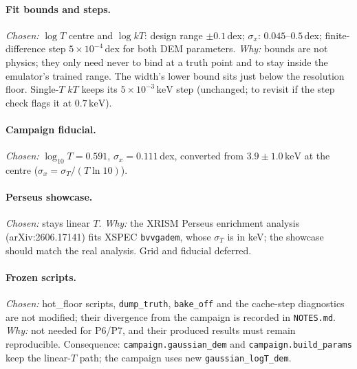 \documentclass[11pt]{article}
\newcommand{\kev}{\,\mathrm{keV}}
\begin{document}
\paragraph{Fit bounds and steps.} \emph{Chosen:} $\log T$ centre and $\log kT$:
design range $\pm0.1$\,dex; $\sigma_x$: $0.045$--$0.5$\,dex; finite-difference
step $5\times10^{-4}$\,dex for both DEM parameters. \emph{Why:} bounds are not
physics; they only need never to bind at a truth point and to stay inside the
emulator's trained range. The width's lower bound sits just below the
resolution floor. Single-$T$ $kT$ keeps its $5\times10^{-3}\kev$ step
(unchanged; to revisit if the step check flags it at $0.7\kev$).

\paragraph{Campaign fiducial.} \emph{Chosen:} $\log_{10}T = 0.591$,
$\sigma_x = 0.111$\,dex, converted from $3.9\pm1.0\kev$ at the centre
($\sigma_x = \sigma_T/(T\ln 10)$).

\paragraph{Perseus showcase.} \emph{Chosen:} stays linear $T$. \emph{Why:} the
XRISM Perseus enrichment analysis (arXiv:2606.17141) fits XSPEC
\texttt{bvvgadem}, whose $\sigma_T$ is in keV; the showcase should match the
real analysis. Grid and fiducial deferred.

\paragraph{Frozen scripts.} \emph{Chosen:} hot\_floor scripts, \texttt{dump\_truth},
\texttt{bake\_off} and the cache-step diagnostics are not modified; their
divergence from the campaign is recorded in \texttt{NOTES.md}. \emph{Why:} not
needed for P6/P7, and their produced results must remain reproducible.
Consequence: \texttt{campaign.gaussian\_dem} and \texttt{campaign.build\_params}
keep the linear-$T$ path; the campaign uses new \texttt{gaussian\_logT\_dem}.
\end{document}
